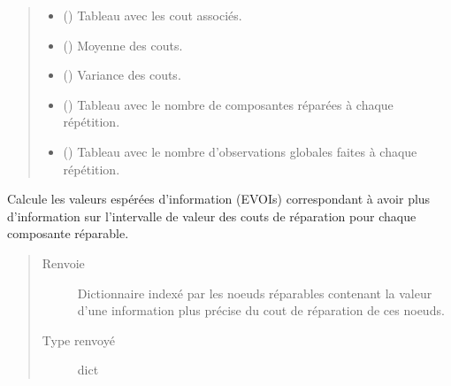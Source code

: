 \documentclass[letterpaper,10pt,french]{sphinxmanual}
\begin{document}
\begin{fulllineitems}
\begin{fulllineitems}
\begin{quote}
\begin{description}
\begin{itemize}
\item {} 
 () \textendash{} Tableau avec les cout associés.

\item {} 
 () \textendash{} Moyenne des couts.

\item {} 
 () \textendash{} Variance des couts.

\item {} 
 () \textendash{} Tableau avec le nombre de composantes réparées à chaque répétition.

\item {} 
 () \textendash{} Tableau avec le nombre d’observations globales faites à chaque
répétition.

\end{itemize}


\end{description}\end{quote}

\end{fulllineitems}


\begin{fulllineitems}
\label{\detokenize{index:DecisionTheoreticTroubleshooting.TroubleShootingProblem.compute_EVOIs}}
Calcule les valeurs espérées d’information (EVOIs) correspondant à
avoir plus d’information sur l’intervalle de valeur des couts de
réparation pour chaque composante réparable.
\begin{quote}\begin{description}
\item[{Renvoie}] \leavevmode
{} \textendash{} Dictionnaire indexé par les noeuds réparables contenant la valeur
d’une information plus précise du cout de réparation de ces noeuds.

\item[{Type renvoyé}] \leavevmode
dict

\end{description}\end{quote}


\end{fulllineitems}
\end{fulllineitems}
\end{document}
